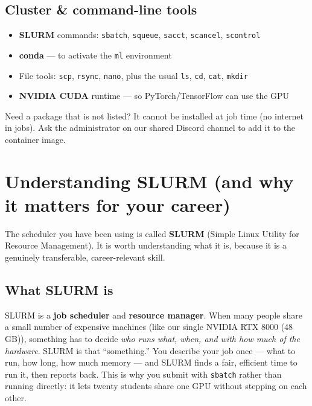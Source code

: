 \documentclass[11pt]{article}
\newcommand{\ContactVia}{our shared Discord channel}   %
\newcommand{\GPUName}{NVIDIA RTX 8000 (48\,GB)}        %
\newcommand{\code}[1]{\texttt{#1}}
\begin{document}
\subsection*{Cluster \& command-line tools}
\begin{itemize}[itemsep=1pt]
  \item \textbf{SLURM} commands: \code{sbatch}, \code{squeue}, \code{sacct}, \code{scancel}, \code{scontrol}
  \item \textbf{conda} --- to activate the \code{ml} environment
  \item File tools: \code{scp}, \code{rsync}, \code{nano}, plus the usual \code{ls}, \code{cd}, \code{cat}, \code{mkdir}
  \item \textbf{NVIDIA CUDA} runtime --- so PyTorch/TensorFlow can use the GPU
\end{itemize}

\begin{notebox}
Need a package that is not listed? It cannot be installed at job time (no internet in jobs). Ask the administrator on \ContactVia{} to add it to the container image.
\end{notebox}

\section{Understanding SLURM (and why it matters for your career)}
The scheduler you have been using is called \textbf{SLURM} (Simple Linux Utility for Resource Management). It is worth understanding what it is, because it is a genuinely transferable, career-relevant skill.

\subsection*{What SLURM is}
SLURM is a \textbf{job scheduler} and \textbf{resource manager}. When many people share a small number of expensive machines (like our single \GPUName), something has to decide \emph{who runs what, when, and with how much of the hardware}. SLURM is that ``something.'' You describe your job once --- what to run, how long, how much memory --- and SLURM finds a fair, efficient time to run it, then reports back. This is why you submit with \code{sbatch} rather than running directly: it lets twenty students share one GPU without stepping on each other.
\end{document}

